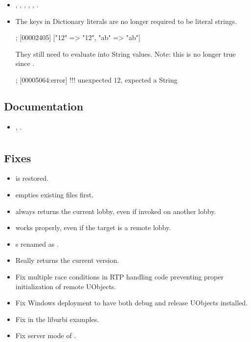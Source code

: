 \begin{itemize}
\item {}, , ,
  , , .

\item The keys in Dictionary literals are no longer required to be literal
  strings.
\begin{urbiscript}
["a" + "b" => "ab", 12.asString => "12"];
[00002405] ["12" => "12", "ab" => "ab"]
\end{urbiscript}

\noindent
They still need to evaluate into String values. Note: this is no longer true
since .

\begin{urbiunchecked}
[12 => "12"];
[00005064:error] !!! unexpected 12, expected a String
\end{urbiunchecked}


\end{itemize}

\subsection{Documentation}
\begin{itemize}
\item {}, .
\end{itemize}

\section{}

\subsection{Fixes}
\begin{itemize}
\item {} is restored.
\item {} empties existing files first.
\item {} always returns the current lobby, even if
  invoked on another lobby.
\item {} works properly, even if the target is a
  remote lobby.
\item {}s renamed as .
\item {} Really returns the current version.
\item Fix multiple race conditions in RTP handling code preventing proper
  initialization of remote UObjects.
\item Fix Windows deployment to have both debug and release UObjects
  installed.
\item Fix  in the liburbi examples.
\item Fix server mode of .
\end{itemize}

